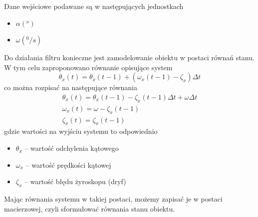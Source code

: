 Dane wejściowe podawane są w następujących jednostkach
\begin{itemize}
    \item $\alpha (^o)$
    \item $\omega (^0/s)$
\end{itemize}

Do działania filtru konieczne jest zamodelowanie obiektu w postaci równań stanu. W tym celu zaproponowano równanie opisujące system
$$
    \theta_x(t) = \theta_x(t-1) + (\omega_x(t-1) - \zeta_x)\Delta t
$$
co można rozpisać na następujące równania
\begin{equation}
    \begin{array}{l}
        \theta_x(t) = \theta_x(t-1) - \zeta_x(t-1)\Delta t + \omega\Delta t \\
        \omega_x(t) = \omega - \zeta_x(t-1) \\
        \zeta_x(t) = \zeta_x(t-1)
    \end{array}
    \label{Rownania obiektu}
\end{equation}
gdzie wartości na wyjściu systemu to odpowiednio
\begin{itemize}
    \item $\theta_x$ -- wartość odchylenia kątowego 
    \item $\omega_x$ -- wartość prędkości kątowej 
    \item $\zeta_x$ -- wartość błędu żyroskopu (dryf)
\end{itemize}

Mając równania systemu w takiej postaci, możemy zapisać je w postaci macierzowej, czyli sformułować równania stanu obiektu.
